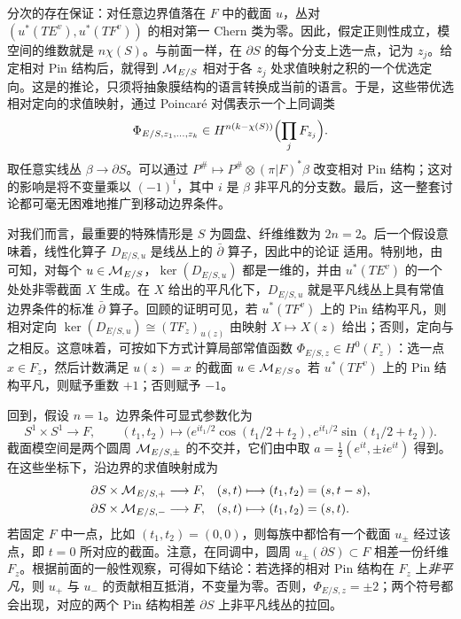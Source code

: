 分次的存在保证：对任意边界值落在 $F$ 中的截面 $u$，丛对 $(u^*(TE^v),u^*(TF^v))$ 的相对第一 Chern 类为零。因此，假定正则性成立，模空间的维数就是 $n\chi(S)$。与前面一样，在 $\partial S$ 的每个分支上选一点，记为 $z_j$。给定相对 Pin 结构后，就得到 $\mathcal M_{E/S}$ 相对于各 $z_j$ 处求值映射之积的一个优选定向。这是的推论，只须将抽象膜结构的语言转换成当前的语言。于是，这些带优选相对定向的求值映射，通过 Poincaré 对偶表示一个上同调类
\begin{equation}\label{eq:17.22}
\Phi_{E/S,z_1,\ldots,z_k}\in H^{n(k-\chi(S))}\Bigl(\prod_jF_{z_j}\Bigr).
\end{equation}
取任意实线丛 $\beta\to\partial S$。可以通过 $P^\#\mapsto P^\#\otimes(\pi|F)^*\beta$ 改变相对 Pin 结构；这对的影响是将不变量乘以 $(-1)^i$，其中 $i$ 是 $\beta$ 非平凡的分支数。最后，这一整套讨论都可毫无困难地推广到移动边界条件。

对我们而言，最重要的特殊情形是 $S$ 为圆盘、纤维维数为 $2n=2$。后一个假设意味着，线性化算子 $D_{E/S,u}$ 是线丛上的 $\bar\partial$ 算子，因此中的论证
适用。特别地，由可知，对每个 $u\in\mathcal M_{E/S}$，$\ker(D_{E/S,u})$ 都是一维的，并由 $u^*(TE^v)$ 的一个处处非零截面 $X$ 生成。在 $X$ 给出的平凡化下，$D_{E/S,u}$ 就是平凡线丛上具有常值边界条件的标准 $\bar\partial$ 算子。回顾的证明可见，若 $u^*(TF^v)$ 上的 Pin 结构平凡，则相对定向 $\ker(D_{E/S,u})\cong(TF_z)_{u(z)}$ 由映射 $X\mapsto X(z)$ 给出；否则，定向与之相反。这意味着，可按如下方式计算局部常值函数 $\Phi_{E/S,z}\in H^0(F_z)$：选一点 $x\in F_z$，然后计数满足 $u(z)=x$ 的截面 $u\in\mathcal M_{E/S}$。若 $u^*(TF^v)$ 上的 Pin 结构平凡，则赋予重数 $+1$；否则赋予 $-1$。

\begin{example}\label{st:17.15}
回到，假设 $n=1$。边界条件可显式参数化为
\[
S^1\times S^1\longrightarrow F,\qquad
(t_1,t_2)\longmapsto\bigl(e^{it_1/2}\cos(t_1/2+t_2),e^{it_1/2}\sin(t_1/2+t_2)\bigr).
\]
截面模空间是两个圆周 $\mathcal M_{E/S,\pm}$ 的不交并，它们由中取 $a=\tfrac12(e^{it},\pm ie^{it})$ 得到。在这些坐标下，沿边界的求值映射成为
\[
\begin{aligned}
\partial S\times\mathcal M_{E/S,+}&\longrightarrow F,&(s,t)&\longmapsto(t_1,t_2)=(s,t-s),\\
\partial S\times\mathcal M_{E/S,-}&\longrightarrow F,&(s,t)&\longmapsto(t_1,t_2)=(s,t).
\end{aligned}
\]
若固定 $F$ 中一点，比如 $(t_1,t_2)=(0,0)$，则每族中都恰有一个截面 $u_\pm$ 经过该点，即 $t=0$ 所对应的截面。注意，在同调中，圆周 $u_\pm(\partial S)\subset F$ 相差一份纤维 $F_z$。根据前面的一般性观察，可得如下结论：若选择的相对 Pin 结构在 $F_z$ 上\emph{非平凡}，则 $u_+$ 与 $u_-$ 的贡献相互抵消，不变量为零。否则，$\Phi_{E/S,z}=\pm2$；两个符号都会出现，对应的两个 Pin 结构相差 $\partial S$ 上非平凡线丛的拉回。
\end{example}


